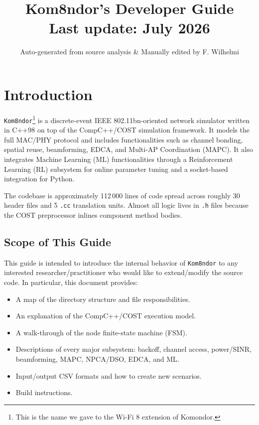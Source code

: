 \documentclass[11pt,a4paper]{article}
\title{%
  \vspace{-1cm}
  {\LARGE\bfseries Kom8ndor's Developer Guide}\\[6pt]
  {\large Last update: July 2026}
}
\author{Auto-generated from source analysis \& Manually edited by F. Wilhelmi}
\date{}
\begin{document}
\maketitle
\tableofcontents
\newpage

\section{Introduction}

\texttt{Kom8ndor}\footnote{This is the name we gave to the Wi-Fi 8 extension of Komondor.} is a discrete-event IEEE 802.11bn-oriented network simulator written in C++98 on top of the CompC++/COST simulation framework.  It models the full MAC/PHY protocol and includes functionalities such as channel bonding, spatial reuse, beamforming, EDCA, and Multi-AP Coordination (MAPC). It also integrates Machine Learning (ML) functionalities through a Reinforcement Learning (RL) subsystem for online parameter tuning and a socket-based integration for Python.

The codebase is approximately 112\,000 lines of code spread across roughly 30 header files and 5 \texttt{.cc} translation units.  Almost all logic lives in \texttt{.h} files because the COST preprocessor inlines component method bodies.

\subsection{Scope of This Guide}

This guide is intended to introduce the internal behavior of \texttt{Kom8ndor} to any interested researcher/practitioner who would like to extend/modify the source code. In particular, this document provides:
\begin{itemize}[nosep]
  \item A map of the directory structure and file responsibilities.
  \item An explanation of the CompC++/COST execution model.
  \item A walk-through of the node finite-state machine (FSM).
  \item Descriptions of every major subsystem: backoff, channel access, power/SINR, beamforming, MAPC, NPCA/DSO, EDCA, and ML.
  \item Input/output CSV formats and how to create new scenarios.
  \item Build instructions.
\end{itemize}
\end{document}
